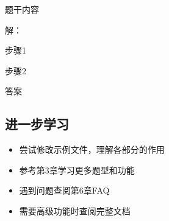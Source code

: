 \begin{latexcode}
  \begin{problem}[points = 10]
    题干内容

    \begin{solution}
      解：

      步骤1 

      步骤2 

      答案 
    \end{solution}
  \end{problem}
\end{latexcode}

\subsection{进一步学习}

\begin{itemize}
  \item 尝试修改示例文件，理解各部分的作用
  \item 参考第3章学习更多题型和功能
  \item 遇到问题查阅第6章FAQ
  \item 需要高级功能时查阅完整文档 
\end{itemize}
